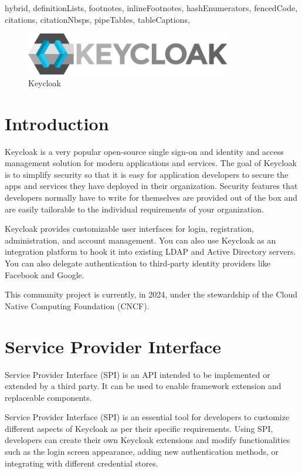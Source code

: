 \documentclass[
  digital,     %
  oneside,     %
  nosansbold,  %
  nocolorbold, %
  lof,         %
  lot,         %
]{fithesis4}
\begin{document}
\begin{markdown*}{%
  hybrid,
  definitionLists,
  footnotes,
  inlineFootnotes,
  hashEnumerators,
  fencedCode,
  citations,
  citationNbsps,
  pipeTables,
  tableCaptions,
}
\begin{figure}[htbp]
  \centering
  \includegraphics[width=0.8\textwidth]{img/keycloak.png}
  \caption{Keycloak}
  \label{fig:keycloak-logo}
\end{figure}

\section{Introduction}
Keycloak is a very popular open-source single sign-on and identity and access management solution for modern applications and services.
The goal of Keycloak is to simplify security so that it is easy for application developers to secure the apps and services they have deployed in their organization.
Security features that developers normally have to write for themselves are provided out of the box and are easily tailorable to the individual requirements of your organization.

Keycloak provides customizable user interfaces for login, registration, administration, and account management.
You can also use Keycloak as an integration platform to hook it into existing LDAP and Active Directory servers.
You can also delegate authentication to third-party identity providers like Facebook and Google.

This community project is currently, in 2024, under the stewardship of the Cloud Native Computing Foundation (CNCF).\cite{keycloak-web}


\newpage
\section{Service Provider Interface}
Service Provider Interface (SPI) is an API intended to be implemented or extended by a third party.
It can be used to enable framework extension and replaceable components.\cite{keycloak-spi}

Service Provider Interface (SPI) is an essential tool for developers to customize different aspects of Keycloak as per their specific requirements.
Using SPI, developers can create their own Keycloak extensions and modify functionalities such as the login screen appearance, adding new authentication methods, or integrating with different credential stores.


\end{markdown*}
\end{document}
